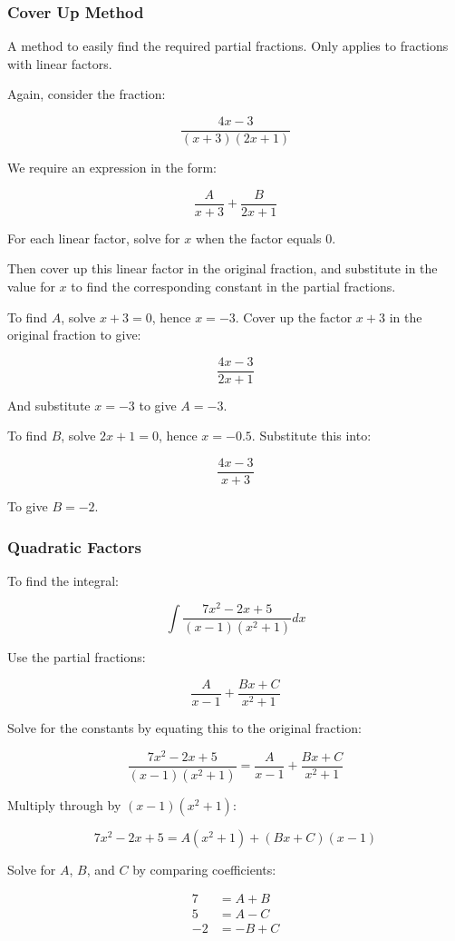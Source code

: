 \documentclass[a4paper,11pt]{report}
\begin{document}
\subsubsection{Cover Up Method}

A method to easily find the required partial fractions.
Only applies to fractions with linear factors.

Again, consider the fraction:

$$
\frac{4x - 3}{(x + 3)(2x + 1)}
$$

We require an expression in the form:

$$
\frac{A}{x + 3} + \frac{B}{2x + 1}
$$

For each linear factor, solve for $x$ when the factor equals 0.

Then cover up this linear factor in the original fraction, and substitute in
the value for $x$ to find the corresponding constant in the partial fractions.

To find $A$, solve $x + 3 = 0$, hence $x = -3$. Cover up the factor $x + 3$ in
the original fraction to give:

$$
\frac{4x - 3}{2x + 1}
$$

And substitute $x = -3$ to give $A = -3$.

To find $B$, solve $2x + 1 = 0$, hence $x = -0.5$. Substitute this into:

$$
\frac{4x - 3}{x + 3}
$$

To give $B = -2$.

\subsubsection{Quadratic Factors}

To find the integral:

$$
\int \frac{7x^2 - 2x + 5}{(x - 1)(x^2 + 1)} dx
$$

Use the partial fractions:

$$
\frac{A}{x - 1} + \frac{Bx + C}{x^2 + 1}
$$

Solve for the constants by equating this to the original fraction:

$$
\frac{7x^2 - 2x + 5}{(x - 1)(x^2 + 1)}  = \frac{A}{x - 1} + \frac{Bx + C}{x^2 + 1}
$$

Multiply through by $(x - 1)(x^2 + 1)$:

$$
7x^2 - 2x + 5  = A(x^2 + 1) + (Bx + C)(x - 1)
$$

Solve for $A$, $B$, and $C$ by comparing coefficients:

$$
\begin{aligned}
7 & = A + B \\
5 & = A - C \\
-2 & = -B + C \\
\end{aligned}
$$
\end{document}

